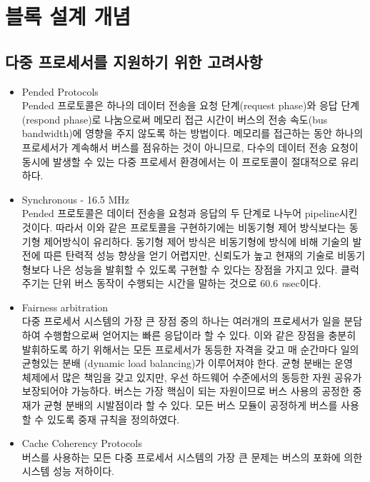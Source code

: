 \section{블록 설계 개념}
\subsection{다중 프로세서를 지원하기 위한 고려사항}
\begin{itemize}
	\item Pended Protocols \\
		Pended 프로토콜은 하나의 데이터 전송을
		요청 단계(request phase)와 응답 단계(respond phase)로
		나눔으로써 메모리 접근 시간이 버스의 전송 속도(bus bandwidth)에
		영향을 주지 않도록 하는 방법이다. 
		메모리를 접근하는 동안 하나의 프로세서가 계속해서 버스를 점유하는
		것이 아니므로, 
		다수의 데이터 전송 요청이 동시에 발생할 수 있는 
		다중 프로세서 환경에서는 이 프로토콜이 절대적으로 유리하다.
	\item Synchronous - 16.5 MHz \\
		Pended 프로토콜은 데이터 전송을 요청과 응답의 두 단계로
		나누어 pipeline시킨 것이다.
		따라서 이와 같은 프로토콜을 구현하기에는 비동기형 제어 방식보다는 
		동기형 제어방식이 유리하다.
		동기형 제어 방식은 비동기형에 방식에 비해 기술의 발전에 따른 
		탄력적 성능 향상을 얻기 어렵지만, 신뢰도가 높고
		현재의 기술로 비동기형보다 나은 성능을 발휘할 수 있도록
		구현할 수 있다는 장점을 가지고 있다.
		클럭 주기는 단위 버스 동작이 수행되는 시간을 말하는
		것으로 60.6 {\it n\/}sec이다.
	\item Fairness arbitration \\
		다중 프로세서 시스템의 가장 큰 장점 중의 하나는 여러개의
		프로세서가 일을 분담하여 수행함으로써 얻어지는 
		빠른 응답이라 할 수 있다. 이와 같은 장점을 충분히 발휘하도록
		하기 위해서는 모든 프로세서가 동등한 자격을 갖고
		매 순간마다 일의 균형있는 분배 (dynamic load balancing)가
		이루어져야 한다.
		균형 분배는 운영 체제에서 많은 책임을 갖고 있지만,
		우선 하드웨어 수준에서의 동등한 자원 공유가 보장되어야 가능하다.
		버스는 가장 핵심이 되는 자원이므로 버스 사용의 공정한 중재가
		균형 분배의 시발점이라 할 수 있다.
		 모든 버스 모듈이 공정하게
		버스를 사용할 수 있도록 중재 규칙을 정의하였다.
	\item Cache Coherency Protocols \\
		버스를 사용하는 모든 다중 프로세서 시스템의 가장 큰 문제는
		버스의 포화에 의한 시스템 성능 저하이다.

\end{itemize}
